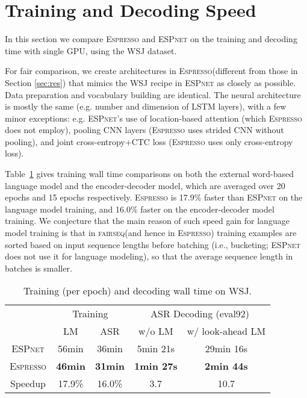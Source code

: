 \documentclass{article}
\def\espresso{\textsc{Espresso}\xspace}
\def\fairseq{\textsc{fairseq}\xspace}
\def\espnet{\textsc{ESPnet}\xspace}
\begin{document}
\section{Training and Decoding Speed}

In this section we compare \espresso and \espnet on the training and decoding time with single GPU, using the WSJ dataset. 

For fair comparison, we create architectures in \espresso (different from those in Section \ref{sec:res}) that mimics the WSJ recipe in \espnet as closely as possible. Data preparation and vocabulary building are identical. The neural architecture is mostly the same (e.g. number and dimension of LSTM layers), with a few minor exceptions: e.g. \espnet's use of location-based attention (which \espresso does not employ),  pooling CNN layers (\espresso uses strided CNN without pooling), and joint cross-entropy+CTC loss (\espresso uses only cross-entropy loss).

Table~\ref{tab:train_speed} gives training wall time comparisons on both the external word-based language model and the encoder-decoder model, which are averaged over 20 epochs and 15 epochs respectively. \espresso is 17.9\% faster than \espnet on the language model training, and 16.0\% faster on the encoder-decoder model training. We conjecture that the main reason of such speed gain for language model training is that in \fairseq (and hence in \espresso) training examples are sorted based on input sequence lengths before batching (i.e., bucketing; \espnet does not use it for language modeling), so that the average sequence length in batches is smaller.

\begin{table}[tb]
  \caption{Training (per epoch) and decoding wall time on WSJ.}
  \label{tab:train_speed}
  \centering
  \begin{adjustbox}{max width=\linewidth}
  \begin{tabular}{c c c c c}
    \toprule
    & \multicolumn{2}{c}{Training} & \multicolumn{2}{c}{ASR Decoding (eval92)} \\
    \cmidrule(lr){2-3} \cmidrule(lr){4-5} 
    & LM & ASR & w/o LM & w/ look-ahead LM \\
    \midrule
    \espnet & 56min & 36min & 5min 21s & 29min 16s \\ \espresso & \textbf{46min} & \textbf{31min} & \bf 1min 27s & \bf 2min 44s \\
    \midrule
    Speedup & 17.9\% & 16.0\% & 3.7 & 10.7 \\
    \bottomrule
  \end{tabular}
  \end{adjustbox}
\end{table}
\end{document}
